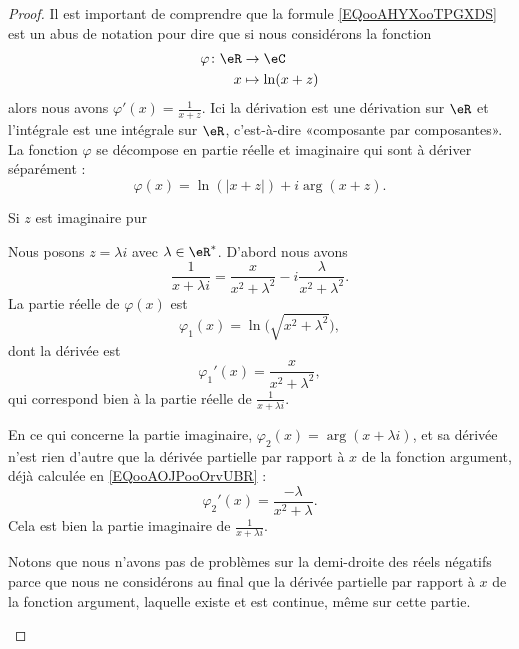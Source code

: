 \begin{proof}
	Il est important de comprendre que la formule \eqref{EQooAHYXooTPGXDS} est un abus de notation pour dire que si nous considérons la fonction
	\begin{equation}
		\begin{aligned}
			\varphi\colon \eR & \to \eC          \\
			x                 & \mapsto \ln(x+z)
		\end{aligned}
	\end{equation}
	alors nous avons \( \varphi'(x)=\frac{1}{ x+z }\). Ici la dérivation est une dérivation sur \( \eR\) et l'intégrale est une intégrale sur \( \eR\), c'est-à-dire «composante par composantes». La fonction \(  \varphi\) se décompose en partie réelle et imaginaire qui sont à dériver séparément :
	\begin{equation}
		\varphi(x)=\ln(| x+z |)+i\arg(x+z).
	\end{equation}

	\begin{subproof}

		\item[Si \( z\) est imaginaire pur]

		Nous posons \( z=\lambda i\) avec \( \lambda\in \eR^*\). D'abord nous avons
		\begin{equation}
			\frac{1}{ x+\lambda i }=\frac{ x }{ x^2+\lambda^2 }-i\frac{ \lambda }{ x^2+\lambda^2 }.
		\end{equation}
		La partie réelle de \( \varphi(x)\) est
		\begin{equation}
			\varphi_1(x)=\ln\big( \sqrt{ x^2+\lambda^2 } \big),
		\end{equation}
		dont la dérivée est
		\begin{equation}
			\varphi_1'(x)=\frac{ x }{ x^2+\lambda^2 },
		\end{equation}
		qui correspond bien à la partie réelle de \( \frac{1}{ x+\lambda i }\).

		En ce qui concerne la partie imaginaire, \( \varphi_2(x)=\arg(x+\lambda i)\), et sa dérivée n'est rien d'autre que la dérivée partielle par rapport à \( x\) de la fonction argument, déjà calculée en \eqref{EQooAOJPooOrvUBR} :
		\begin{equation}
			\varphi_2'(x)=\frac{ -\lambda }{ x^2+\lambda }.
		\end{equation}
		Cela est bien la partie imaginaire de \( \frac{1}{ x+\lambda i }\).

		Notons que nous n'avons pas de problèmes sur la demi-droite des réels négatifs parce que nous ne considérons au final que la dérivée partielle par rapport à \( x\) de la fonction argument, laquelle existe et est continue, même sur cette partie.


\end{subproof}
\end{proof}

